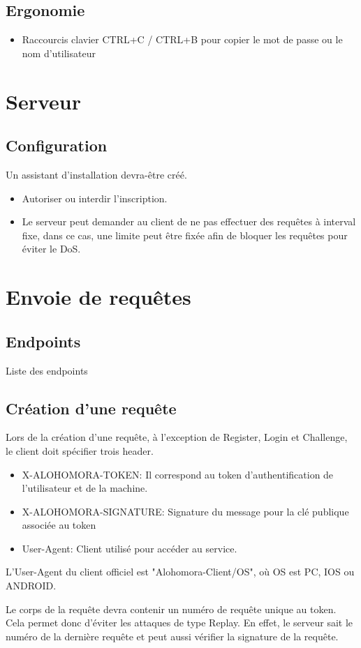 \documentclass[oneside]{report}
\begin{document}
	\section{Ergonomie}{
		\begin{itemize}
			\item Raccourcis clavier CTRL+C / CTRL+B pour copier le mot de passe ou le nom d'utilisateur
		\end{itemize}
	}

	\chapter{Serveur}
	\section{Configuration}{
		\par Un assistant d'installation devra-être créé.
		\begin{itemize}
			\item Autoriser ou interdir l'inscription.
			\item Le serveur peut demander au client de ne pas effectuer des requêtes à interval fixe, dans ce cas, une limite peut être fixée afin de bloquer les requêtes pour éviter le DoS.
		\end{itemize}
	}

	\chapter{Envoie de requêtes}
	\section{Endpoints}{
		\par Liste des endpoints
	}

	\section{Création d'une requête}{
		\par Lors de la création d'une requête, à l'exception de Register, Login et Challenge, le client doit spécifier trois header.
		\begin{itemize}
			\item X-ALOHOMORA-TOKEN: Il correspond au token d'authentification de l'utilisateur et de la machine.
			\item X-ALOHOMORA-SIGNATURE: Signature du message pour la clé publique associée au token
			\item User-Agent: Client utilisé pour accéder au service.
		\end{itemize}

		\par L'User-Agent du client officiel est "Alohomora-Client/{OS}", où OS est PC, IOS ou ANDROID.
		\par Le corps de la requête devra contenir un numéro de requête unique au token. Cela permet donc d'éviter les attaques de type Replay. En effet, le serveur sait le numéro de la dernière requête et peut aussi vérifier la signature de la requête.
	}
\end{document}
